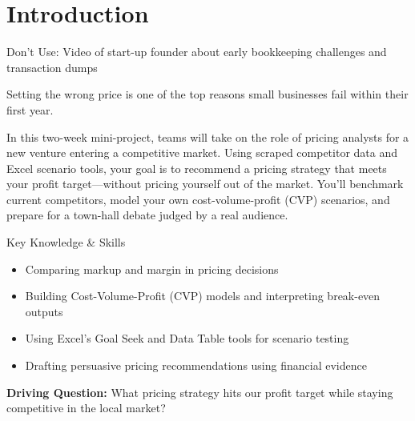 
\section{Introduction}
\begin{Replace}
Don't Use: Video of start-up founder about early bookkeeping challenges and transaction dumps
\end{Replace}

\begin{Trivia}
Setting the wrong price is one of the top reasons small businesses fail within their first year.
\end{Trivia}

In this two-week mini-project, teams will take on the role of pricing analysts for a new venture entering a competitive market. Using scraped competitor data and Excel scenario tools, your goal is to recommend a pricing strategy that meets your profit target—without pricing yourself out of the market. You'll benchmark current competitors, model your own cost-volume-profit (CVP) scenarios, and prepare for a town-hall debate judged by a real audience.

\begin{skillbox}{Key Knowledge \& Skills}
\begin{itemize}
  \item Comparing markup and margin in pricing decisions
  \item Building Cost-Volume-Profit (CVP) models and interpreting break-even outputs
  \item Using Excel's Goal Seek and Data Table tools for scenario testing
  \item Drafting persuasive pricing recommendations using financial evidence
\end{itemize}
\end{skillbox}

\begin{Important}
\textbf{Driving Question:} What pricing strategy hits our profit target while staying competitive in the local market?
\end{Important}


\clearpage
